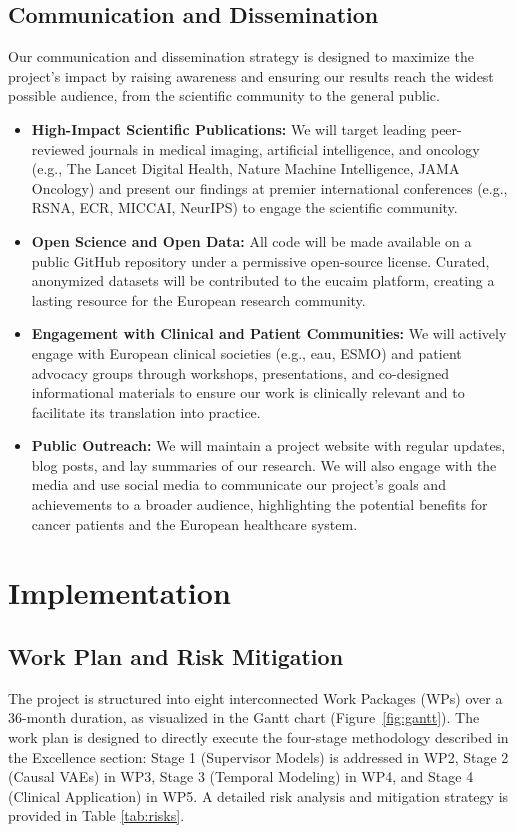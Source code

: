 \documentclass[11pt, a4paper]{article}
\begin{document}
\subsection{Communication and Dissemination}
Our communication and dissemination strategy is designed to maximize the project's impact by raising awareness and ensuring our results reach the widest possible audience, from the scientific community to the general public.
\begin{itemize}
    \item \textbf{High-Impact Scientific Publications:} We will target leading peer-reviewed journals in medical imaging, artificial intelligence, and oncology (e.g., The Lancet Digital Health, Nature Machine Intelligence, JAMA Oncology) and present our findings at premier international conferences (e.g., RSNA, ECR, MICCAI, NeurIPS) to engage the scientific community.
    \item \textbf{Open Science and Open Data:} All code will be made available on a public GitHub repository under a permissive open-source license. Curated, anonymized datasets will be contributed to the \gls{eucaim} platform, creating a lasting resource for the European research community.
    \item \textbf{Engagement with Clinical and Patient Communities:} We will actively engage with European clinical societies (e.g., \gls{eau}, ESMO) and patient advocacy groups through workshops, presentations, and co-designed informational materials to ensure our work is clinically relevant and to facilitate its translation into practice.
    \item \textbf{Public Outreach:} We will maintain a project website with regular updates, blog posts, and lay summaries of our research. We will also engage with the media and use social media to communicate our project's goals and achievements to a broader audience, highlighting the potential benefits for cancer patients and the European healthcare system.
\end{itemize}

\section{Implementation}

\subsection{Work Plan and Risk Mitigation}
The project is structured into eight interconnected Work Packages (WPs) over a 36-month duration, as visualized in the Gantt chart (Figure~\ref{fig:gantt}). The work plan is designed to directly execute the four-stage methodology described in the Excellence section: Stage 1 (Supervisor Models) is addressed in WP2, Stage 2 (Causal VAEs) in WP3, Stage 3 (Temporal Modeling) in WP4, and Stage 4 (Clinical Application) in WP5. A detailed risk analysis and mitigation strategy is provided in Table \ref{tab:risks}.
\end{document}
